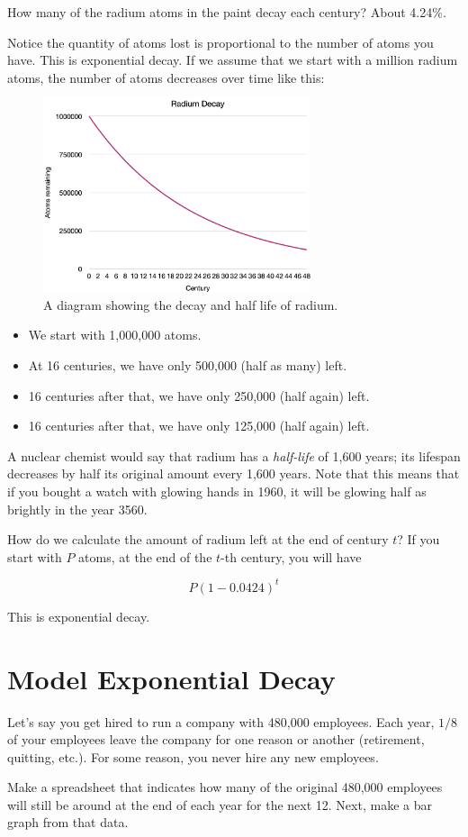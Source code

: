 How many of the radium atoms in the paint decay each century? About 4.24\%.

Notice the quantity of atoms lost is proportional to the number of
atoms you have. This is exponential decay. If we assume that we start
with a million radium atoms, the number of atoms decreases over time like this:
\begin{figure}[htbp]
    \centering
    \includegraphics[width=0.7\textwidth]{radium_decay.png}
    \caption{A diagram showing the decay and half life of radium.}
    \label{fig:radium_decay}
\end{figure}
 
\begin{itemize}
\item We start with 1,000,000 atoms.
\item At 16 centuries, we have only 500,000 (half as many) left.
\item 16 centuries after that, we have only 250,000 (half again) left.
\item 16 centuries after that, we have only 125,000 (half again) left.
\end{itemize}

A nuclear chemist would say that radium has a \textit{half-life} of
1,600 years; its lifespan decreases by half its original amount every 1,600 years. Note that this means that if you bought a watch with
glowing hands in 1960, it will be glowing half as brightly in the year
3560.

How do we calculate the amount of radium left at the end of century
$t$? If you start with $P$ atoms, at the end of the $t$-th century, you
will have

$$P\left(1 - 0.0424\right)^t$$

This is exponential decay.

\section{Model Exponential Decay}

Let's say you get hired to run a company with 480,000
employees. Each year, $1/8$ of your employees leave the company for
one reason or another (retirement, quitting, etc.). For some reason, you never
hire any new employees.

Make a spreadsheet that indicates how many of the original 480,000
employees will still be around at the end of each year for the next 12. Next, make a
bar graph from that data.

